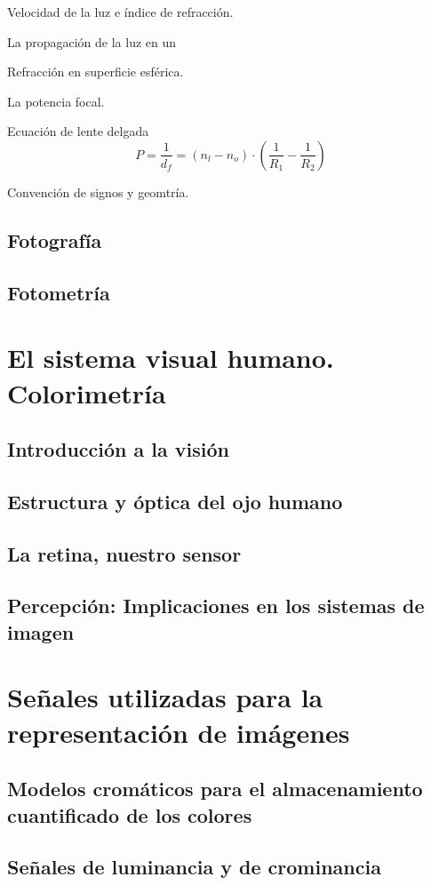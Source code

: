 \documentclass[a4paper]{book}
\begin{document}
Velocidad de la luz e índice de refracción.

La propagación de la luz en un 

Refracción en superficie esférica.

La potencia focal.

Ecuación de lente delgada
\[ P=\frac{1}{d_f}=\left( n_l-n_o \right) \cdot \left( \frac{1}{R_1} - \frac{1}{R_2}  \right)  \]

Convención de signos y geomtría.

\section{Fotografía}

\section{Fotometría}

\chapter{El sistema visual humano. Colorimetría}
\section{Introducción a la visión}
\section{Estructura y óptica del ojo humano}
\section{La retina, nuestro sensor}
\section{Percepción: Implicaciones en los sistemas de imagen}

\chapter{Señales utilizadas para la representación de imágenes}
\section{Modelos cromáticos para el almacenamiento cuantificado de los colores}
\section{Señales de luminancia y de crominancia}
\end{document}
